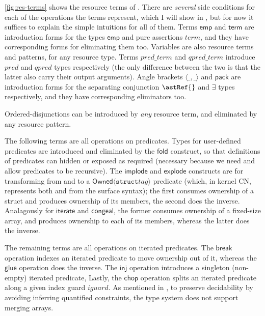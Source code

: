 \cref{fig:res-terms} shows the resource terms of . There are
\emph{several} side conditions for each of the operations the terms represent,
which I will show in , but for now it suffices to
explain the simple intuitions for all of them. Terms $\mathsf{emp}$ and
$\mathsf{term}$ are introduction forms for the types $\mathsf{emp}$ and pure
assertions $\mathit{term}$, and they have corresponding forms for eliminating
them too. Variables are also resource terms and patterns, for any resource
type. Terms $\mathit{pred\_term}$ and $\mathit{qpred\_term}$ introduce
$\mathit{pred}$ and $\mathit{qpred}$ types respectively (the only difference
between the two is that the latter also carry their output arguments). Angle
brackets $\langle \_ , \_ \rangle$ and $\mathsf{pack}$ are introduction forms
for the separating conjunction $\astRef{}$ and $\exists$ types respectively,
and they have corresponding eliminators too.

Ordered-disjunctions can be introduced by \emph{any} resource term, and
eliminated by any resource pattern.

The following terms are all operations on predicates. Types for
user-defined predicates are introduced and eliminated by the $\mathsf{fold}$
construct, so that definitions of predicates can hidden or exposed as required
(necessary because we need and allow predicates to be recursive). The
$\mathsf{implode}$ and $\mathsf{explode}$ constructs are for transforming from
and to a $\mathsf{Owned}\langle \mathtt{struct} \mathit{tag} \rangle$ predicate
(which, in kernel CN, represents both  and
 from the surface syntax); the first consumes ownership of
a struct and produces ownership of its members, the second does the inverse.
Analagously for $\mathsf{iterate}$ and $\mathsf{congeal}$, the former consumes
ownership of a fixed-size array, and produces ownership to each of its members,
whereas the latter does the inverse.

The remaining terms are all operations on iterated predicates. The $\mathsf{break}$
operation indexes an iterated predicate to move ownership out of it, whereas
the $\mathsf{glue}$ operation does the inverse. The $\mathsf{inj}$ operation
introduces a singleton (non-empty) iterated predicate,
Lastly, the $\mathsf{chop}$ operation splits an iterated predicate along a given
index guard $\mathit{iguard}$. As mentioned in , to
preserve decidability by avoiding inferring quantified constraints, the type
system does not support merging arrays.

